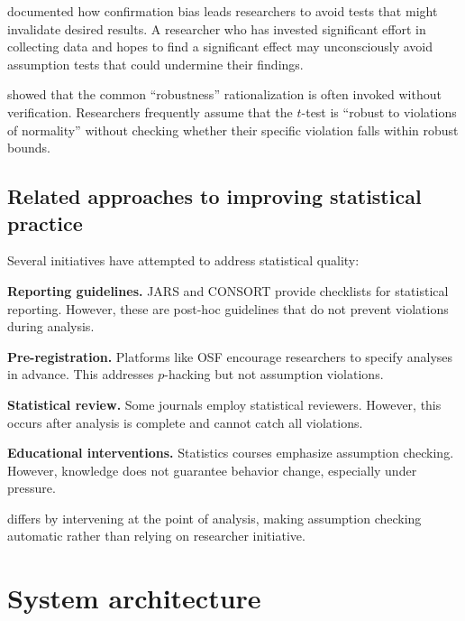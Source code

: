 \documentclass[article]{jss}
\begin{document}
\citet{nickerson1998confirmation} documented how confirmation bias leads researchers to avoid tests that might invalidate desired results. A researcher who has invested significant effort in collecting data and hopes to find a significant effect may unconsciously avoid assumption tests that could undermine their findings.

\citet{zimmerman2004note} showed that the common ``robustness'' rationalization is often invoked without verification. Researchers frequently assume that the $t$-test is ``robust to violations of normality'' without checking whether their specific violation falls within robust bounds.

\subsection{Related approaches to improving statistical practice}

Several initiatives have attempted to address statistical quality:

\textbf{Reporting guidelines.} JARS \citep{appelbaum2018jars} and CONSORT \citep{schulz2010consort} provide checklists for statistical reporting. However, these are post-hoc guidelines that do not prevent violations during analysis.

\textbf{Pre-registration.} Platforms like OSF \citep{nosek2018preregistration} encourage researchers to specify analyses in advance. This addresses $p$-hacking but not assumption violations.

\textbf{Statistical review.} Some journals employ statistical reviewers. However, this occurs after analysis is complete and cannot catch all violations.

\textbf{Educational interventions.} Statistics courses emphasize assumption checking. However, knowledge does not guarantee behavior change, especially under pressure.

 differs by intervening at the point of analysis, making assumption checking automatic rather than relying on researcher initiative.


\section{System architecture} \label{sec:architecture}
\end{document}
